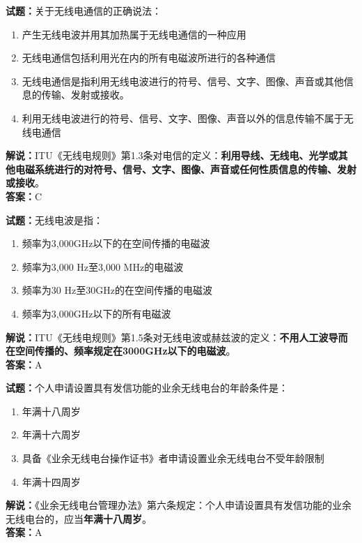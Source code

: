 \documentclass{ctexbook}
\begin{document}
\vspace{1em}

\textbf{试题：}关于无线电通信的正确说法：
\begin{enumerate}[leftmargin=3em]
  \item 产生无线电波并用其加热属于无线电通信的一种应用
  \item 无线电通信包括利用光在内的所有电磁波所进行的各种通信
  \item 无线电通信是指利用无线电波进行的符号、信号、文字、图像、声音或其他信息的传输、发射或接收。
  \item 利用无线电波进行的符号、信号、文字、图像、声音以外的信息传输不属于无线电通信
\end{enumerate}
\noindent\textbf{解说：}ITU《无线电规则》第1.3条对电信的定义：\textbf{利用导线、无线电、光学或其他电磁系统进行的对符号、信号、文字、图像、声音或任何性质信息的传输、发射或接收}。\\\noindent\textbf{答案：}C

\vspace{1em}

\textbf{试题：}无线电波是指：
\begin{enumerate}[leftmargin=3em]
  \item 频率为3,000\unit{\GHz}以下的在空间传播的电磁波
  \item 频率为3,000 Hz至3,000 \unit{\MHz}的电磁波
  \item 频率为30 Hz至30\unit{\GHz}的在空间传播的电磁波
  \item 频率为3,000\unit{\GHz}以下的所有电磁波
\end{enumerate}
\noindent\textbf{解说：}ITU《无线电规则》第1.5条对无线电波或赫兹波的定义：\textbf{不用人工波导而在空间传播的、频率规定在3000\unit{\GHz}以下的电磁波}。\\\noindent\textbf{答案：}A

\vspace{1em}

\textbf{试题：}个人申请设置具有发信功能的业余无线电台的年龄条件是：
\begin{enumerate}[leftmargin=3em]
  \item 年满十八周岁
  \item 年满十六周岁
  \item 具备《业余无线电台操作证书》者申请设置业余无线电台不受年龄限制
  \item 年满十四周岁
\end{enumerate}
\noindent\textbf{解说：}《业余无线电台管理办法》第六条规定：个人申请设置具有发信功能的业余无线电台的，应当\textbf{年满十八周岁}。\\\noindent\textbf{答案：}A
\end{document}
